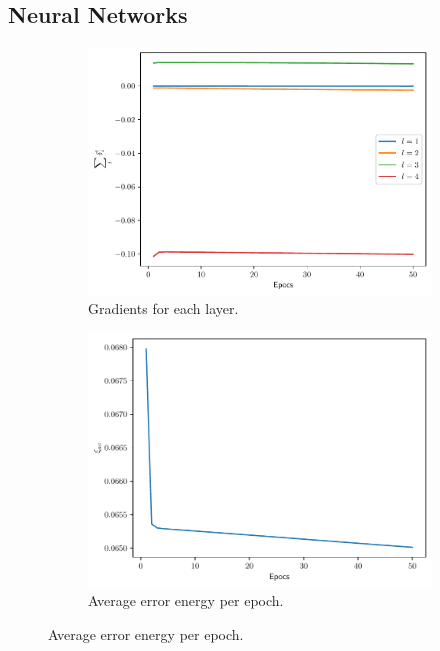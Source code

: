 \documentclass[conference]{IEEEtran}
\theoremstyle{definition}
\theoremstyle{remark}
\theoremstyle{remark}
\begin{document}
\subsection{Neural Networks}
\begin{figure}
    \centering
    \begin{subfigure}[b]{0.32\textwidth}
        \centering
        \includegraphics[width=\textwidth]{figs/1-2-3-0.9-gradients.pdf}
        \caption{Gradients for each layer.}
    \end{subfigure}
    \begin{subfigure}[b]{0.32\textwidth}
        \centering
        \includegraphics[width=\textwidth]{figs/1-2-3-0.9-error.pdf}
        \caption{Average error energy per epoch.}
    \end{subfigure}

\end{figure}
\end{document}
